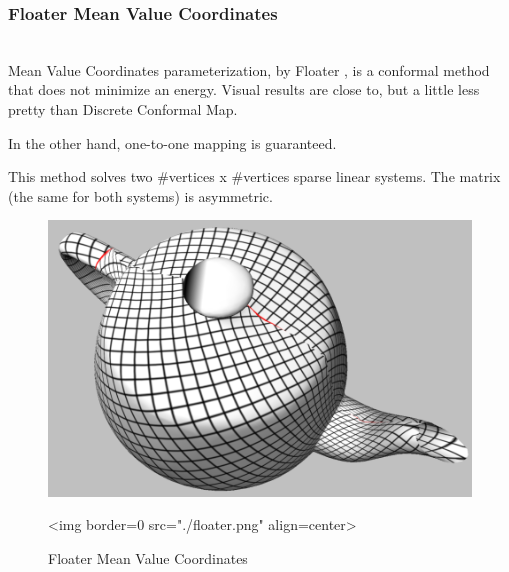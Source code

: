 \subsubsection{Floater Mean Value Coordinates}

  \\

Mean Value Coordinates parameterization, by Floater \cite{cgal:f-mvc-03},
is a conformal method that does not minimize an energy. Visual results
are close to, but a little less pretty than Discrete Conformal Map.

In the other hand, one-to-one mapping is guaranteed.

This method solves two \#vertices x \#vertices sparse linear systems. The matrix
(the same for both systems) is asymmetric.

\begin{figure}[bht]
    \begin{center}
        \begin{ccTexOnly}
            \includegraphics{Parameterization/floater} %
        \end{ccTexOnly}
        \begin{ccHtmlOnly}
            <img border=0 src="./floater.png" align=center>
        \end{ccHtmlOnly}
        \label{parameterization-fig-floater}

        \caption{Floater Mean Value Coordinates}
    \end{center}
\end{figure}


